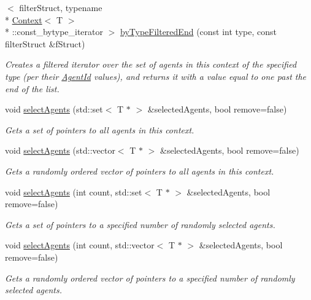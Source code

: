 \begin{DoxyCompactItemize}
$<$ filter\-Struct, typename \\*
\hyperlink{classrepast_1_1_context}{Context}$<$ T $>$\\*
\-::const\-\_\-bytype\-\_\-iterator $>$ \hyperlink{classrepast_1_1_context_a94cee2bd8c4325a7fe79048c0f12a5b6}{by\-Type\-Filtered\-End} (const int type, const filter\-Struct \&f\-Struct)
\begin{DoxyCompactList}\small\item\em Creates a filtered iterator over the set of agents in this context of the specified type (per their \hyperlink{classrepast_1_1_agent_id}{Agent\-Id} values), and returns it with a value equal to one past the end of the list. \end{DoxyCompactList}\item 
void \hyperlink{classrepast_1_1_context_a6f389ebd5bea672d5d7d14ffba5b710f}{select\-Agents} (std\-::set$<$ T $\ast$ $>$ \&selected\-Agents, bool remove=false)
\begin{DoxyCompactList}\small\item\em Gets a set of pointers to all agents in this context. \end{DoxyCompactList}\item 
void \hyperlink{classrepast_1_1_context_aacc9180a8ff5e079ca37edb08a434ff9}{select\-Agents} (std\-::vector$<$ T $\ast$ $>$ \&selected\-Agents, bool remove=false)
\begin{DoxyCompactList}\small\item\em Gets a randomly ordered vector of pointers to all agents in this context. \end{DoxyCompactList}\item 
void \hyperlink{classrepast_1_1_context_a305bd5cfc509be346842567fdf72f97d}{select\-Agents} (int count, std\-::set$<$ T $\ast$ $>$ \&selected\-Agents, bool remove=false)
\begin{DoxyCompactList}\small\item\em Gets a set of pointers to a specified number of randomly selected agents. \end{DoxyCompactList}\item 
void \hyperlink{classrepast_1_1_context_acba9351838355a0cfe3dff074448bbc5}{select\-Agents} (int count, std\-::vector$<$ T $\ast$ $>$ \&selected\-Agents, bool remove=false)
\begin{DoxyCompactList}\small\item\em Gets a randomly ordered vector of pointers to a specified number of randomly selected agents. \end{DoxyCompactList}\item 

\end{DoxyCompactItemize}
